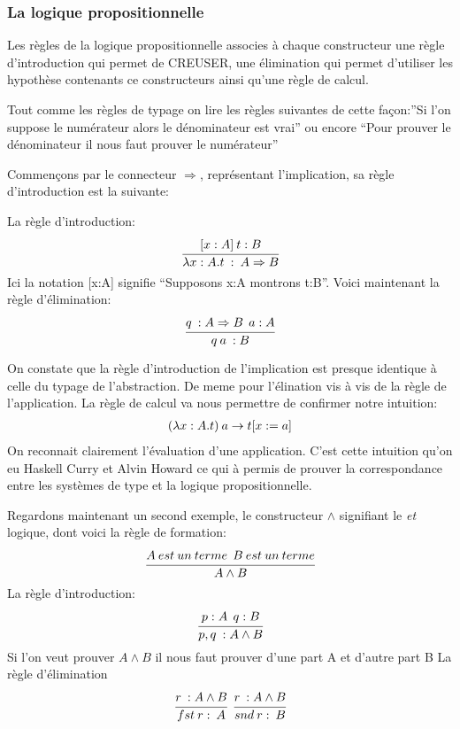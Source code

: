 \documentclass {article}
\theoremstyle{definition}
\theoremstyle{remark}
\begin{document}
\subsubsection{La logique propositionnelle}

Les règles de la logique propositionnelle associes à chaque constructeur 
une règle d'introduction qui permet de CREUSER, une élimination qui permet d'utiliser 
les hypothèse contenants ce constructeurs ainsi qu'une règle de calcul.

Tout comme les règles de typage on lire les règles suivantes de cette façon:''Si l'on suppose le numérateur
alors le dénominateur est vrai'' ou encore ``Pour prouver le dénominateur il nous faut prouver le numérateur''

Commençons par le connecteur $\Rightarrow$, représentant l'implication, sa règle d'introduction est la suivante:

La règle d'introduction:
\begin{align*}
  \cfrac{[x:A] \: t:B}
        {\lambda x:A.t\: :\: A\Rightarrow B}
\end{align*}
Ici la notation [x:A] signifie ``Supposons x:A montrons t:B''.
Voici maintenant la règle d'élimination:
\begin{align*}
  \cfrac{q\: :A\Rightarrow B\:\: a:A}
        {q\:a\: : B}
\end{align*}

On constate que la règle d'introduction de l'implication est presque identique à celle 
du typage de l'abstraction. De meme pour l'élination vis à vis de la règle de l'application.
La règle de calcul va nous permettre de confirmer notre intuition:
\begin{align*}
  (\lambda x:A. t)\:a\rightarrow t[x := a]
\end{align*}
On reconnait clairement l'évaluation d'une application. C'est cette intuition 
qu'on eu Haskell Curry et Alvin Howard ce qui à permis de prouver la correspondance
entre les systèmes de type et la logique propositionnelle.

Regardons maintenant un second exemple, le constructeur $\land$ signifiant le \emph{et} logique, dont voici la règle de 
formation:
\begin{align*}
\cfrac{A \:est\: un\: terme \:\: B\:est\:un\:terme}
{A\land B} 
\end{align*}
La règle d'introduction:
\begin{align*}
\cfrac{p:A\:\:q:B}
{p,q\: : A\land B}
\end{align*}
Si l'on veut prouver $A\land B$ il nous faut prouver d'une part A et d'autre part B
La règle d'élimination 
\begin{align*}
\cfrac{r\: : A\land B}
      {fst\:r:\:A} \:\:
      \cfrac{r\: : A\land B}
            {snd\:r:\:B}
\end{align*}
\end{document}
